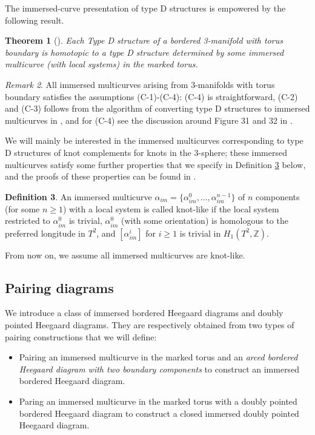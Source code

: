 \documentclass{amsart}
\newtheorem{thm}{Theorem}[section]
\theoremstyle{definition}
\newtheorem{defn}[thm]{Definition}
\theoremstyle{remark}
\newtheorem{rmk}[thm]{Remark}
\numberwithin{equation}{section}
\numberwithin{equation}{section} \makeatletter
\begin{document}
The immersed-curve presentation of type D structures is empowered by the following result. 
\begin{thm}[\cite{hanselman2016bordered}]
Each Type D structure of a bordered 3-manifold with torus boundary is homotopic to a type D structure determined by some immersed multicurve (with local systems) in the marked torus.
\end{thm} 

\begin{rmk}\label{Remark, no circle type immersed curve for knot complements}
	All immersed multicurves arising from 3-manifolds with torus boundary satisfies the assumptions (C-1)-(C-4): (C-4) is straightforward, (C-2) and (C-3) follows from the algorithm of converting type D structures to immersed multicurves in \cite{hanselman2016bordered}, and for (C-4) see the discussion around Figure 31 and 32 in \cite{Hanselman2022}. 
\end{rmk}
We will mainly be interested in the immersed multicurves corresponding to type D structures of knot complements for knots in the 3-sphere; these immersed multicurves satisfy some further properties that we specify in Definition \ref{Definition, immersed curve in the marked torus} below, and the proofs of these properties can be found in \cite[Section 4]{Hanselman2022}. 
\begin{defn}\label{Definition, immersed curve in the marked torus}
	An immersed multicurve $\alpha_{im}=\{\alpha_{im}^0,\ldots,\alpha_{im}^{n-1}\}$ of $n$ components (for some $n\geq 1$) with a local system is called knot-like if the local system restricted to ${\alpha_{im}^0}$ is trivial, $\alpha_{im}^0$ (with some orientation) is homologous to the preferred longitude in $T^2$, and $[\alpha_{im}^i]$ for $i\geq 1$ is trivial in $H_1(T^2,\mathbb{Z})$. 
\end{defn}
From now on, we assume all immersed multicurves are knot-like. 
\subsection{Pairing diagrams}\label{Subsection, pairing construction}
We introduce a class of immersed bordered Heegaard diagrams and doubly pointed Heegaard diagrams. They are respectively obtained from two types of pairing constructions that we will define:
\begin{itemize}
\item[(1)]Pairing an immersed multicurve in the marked torus and an \emph{arced bordered Heegaard diagram with two boundary components} to construct an immersed bordered Heegaard diagram.
\item[(2)]Paring an immersed multicurve in the marked torus with a doubly pointed bordered Heegaard diagram to construct a closed immersed doubly pointed Heegaard diagram.
\end{itemize}
\end{document}
